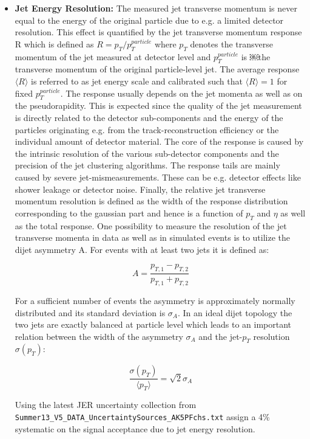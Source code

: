 \begin{itemize}
	\item \textbf{Jet Energy Resolution:}  The measured jet transverse momentum is never equal to the energy of the original particle due to e.g. a limited detector resolution. This effect is quantified by the jet transverse momentum response R which is defined as $R = p_{T} / p_{T}^{particle}$  where $p_{T}$ denotes the transverse momentum of the jet measured at detector level and $p_{T}^{particle}$ is ￼the transverse momentum of the original particle-level jet. The average response $\langle R \rangle$ is referred to as jet energy scale and calibrated such that $\langle R \rangle = 1$ for fixed $p_{T}^{particle}$. The response usually depends on the jet momenta as well as on the pseudorapidity. This is expected since the quality of the jet measurement is directly related to the detector sub-components and the energy of the particles originating e.g. from the track-reconstruction efficiency or the individual amount of detector material. The core of the response is caused by the intrinsic resolution of the various sub-detector components and the precision of the jet clustering algorithms. The response tails are mainly caused by severe jet-mismeasurements. These can be e.g. detector effects like shower leakage or detector noise. Finally, the relative jet transverse momentum resolution is defined as the width of the response distribution corresponding to the gaussian part and hence is a function of $p_{T}$ and $\eta$ as well as the total response. One possibility to measure the resolution of the jet transverse momenta in data as well as in simulated events is to utilize the dijet asymmetry A. For events with at least two jets it is defined as:
	
	\begin{equation}
	A = \frac{p_{T,1} - p_{T,2}}{p_{T,1} + p_{T,2}}
	\end{equation}
	
	For a sufficient number of events the asymmetry is approximately normally distributed and its standard deviation is $\sigma_{A}$. In an ideal dijet topology the two jets are exactly balanced at particle level which leads to an important relation between the width of the asymmetry $\sigma_{A}$ and the jet-$p_{T}$ resolution $\sigma(p_{T})$:
	
	\begin{equation}
	\frac{\sigma(p_{T})}{\langle p_{T} \rangle} = \sqrt{2} \sigma_{A}
	\end{equation}
	
	Using the latest JER uncertainty collection from \texttt{Summer13\_\-V5\_DATA\_\-Uncertainty\-Sources\_\-AK5PFchs.txt} assign a 4\% systematic on the signal acceptance due to jet energy resolution. 
	

\end{itemize}
